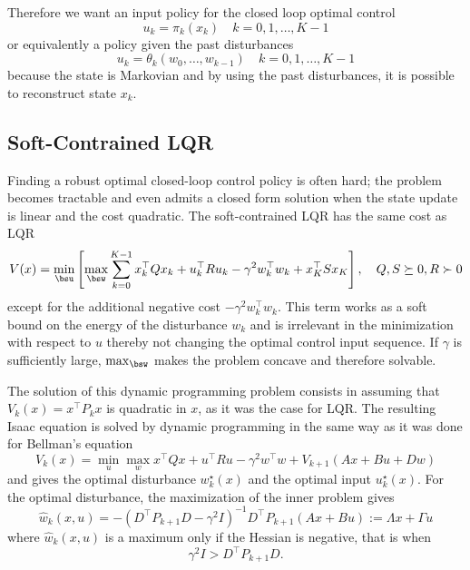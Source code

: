 Therefore we want an input policy for the closed loop optimal control
\begin{equation*}
  u_k = \pi_k(x_k)\quad k=0,1,\ldots, K-1
\end{equation*}
or equivalently a policy given the past disturbances
\begin{equation*}
  u_k = \theta_k(w_0,\ldots,w_{k-1})\quad k=0,1,\ldots, K-1
\end{equation*}
because the state is Markovian and by using the past disturbances, it is possible to reconstruct state $x_k$.

\subsection{Soft-Contrained LQR}
\label{sec:soft-contrained-lqr}

Finding a robust optimal closed-loop control policy is often hard; the problem becomes tractable and even admits a closed form solution when the state update is linear and the cost quadratic. The soft-contrained LQR has the same cost as LQR
\begin{equation*}
  V(x) = \min_{\bsu} \left[\max_{\bsw} \sum_{k=0}^{K-1} x_k^\top Qx_k + u_k^\top R u_k - \gamma^2 w_k^\top w_k + x_K^\top Sx_K\right],\quad Q,S\succeq 0, R\succ 0
\end{equation*}
except for the additional negative cost $-\gamma^2 w_k^\top w_k$. This term works as a soft bound on the energy of the disturbance $w_k$ and is irrelevant in the minimization with respect to $u$ thereby not changing the optimal control input sequence. If $\gamma$ is sufficiently large, $\max_{\bsw}$ makes the problem concave and therefore solvable.

The solution of this dynamic programming problem consists in assuming that $V_k(x) = x^\top P_kx$ is quadratic in $x$, as it was the case for LQR. The resulting Isaac equation is solved by dynamic programming in the same way as it was done for Bellman's equation
\begin{equation*}
  V_k(x) = \min_u \max_w x^\top Qx + u^\top Ru - \gamma^2 w^\top w + V_{k+1}(Ax+Bu+Dw)
\end{equation*}
and gives the optimal disturbance $w_k^\star(x)$ and the optimal input $u_k^\star(x)$. For the optimal disturbance, the maximization of the inner problem gives
\begin{equation*}
  \hat{w}_k(x,u) = -(D^\top P_{k+1}D-\gamma^2I)^{-1}D^\top P_{k+1} (Ax+Bu) := \Lambda x + \Gamma u
\end{equation*}
where $\hat{w}_k(x,u)$ is a maximum only if the Hessian is negative, that is when
\begin{equation*}
  \gamma^2 I > D^\top P_{k+1}D.
\end{equation*}

